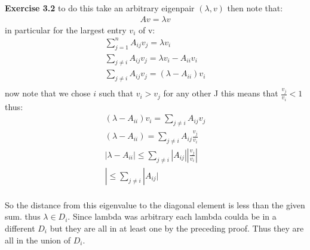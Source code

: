 \documentclass[12pt]{article}
\newenvironment{exercise}[1]{\vspace{.1in}\noindent\textbf{Exercise #1 \hspace{.05em}}}{}
\theoremstyle{definition}
\theoremstyle{remark}
\begin{document}
\begin{exercise}{3.2}
	to do this take an arbitrary eigenpair $(\lambda,v)$ then note that:
	\begin{align}
		Av=\lambda v
	\end{align}
	in particular for the largest entry $v_i$ of v:
	\begin{align}
		\sum_{j=1}^nA_{ij}v_j=\lambda v_i             \\
		\sum_{j\neq i}A_{ij}v_j=\lambda v_i-A_{ii}v_i \\
		\sum_{j\neq i}A_{ij}v_j=(\lambda -A_{ii})v_i  \\
	\end{align}
	now note that we chose $i$ such that $v_i>v_j$ for any other J this means that $\frac{v_j}{v_i}<1$ thus:
	\begin{align}
		(\lambda -A_{ii})v_i = \sum_{j\neq i}A_{ij}v_j                  \\
		(\lambda -A_{ii}) = \sum_{j\neq i}A_{ij} \frac{v_j}{v_i}        \\
		|\lambda -A_{ii}| \leq \sum_{j\neq i}|A_{ij}| |\frac{v_j}{v_i}| \\
		| \leq \sum_{j\neq i}|A_{ij}|                                   \\
	\end{align}

	So the distance from this eigenvalue to the diagonal element is less than the given sum. thus $\lambda\in D_i$. Since lambda was arbitrary each lambda coulda be in a different $D_i$ but they are all in at least one by the preceding proof. Thus they are all in the union of $D_i$.



\end{exercise}
\end{document}
